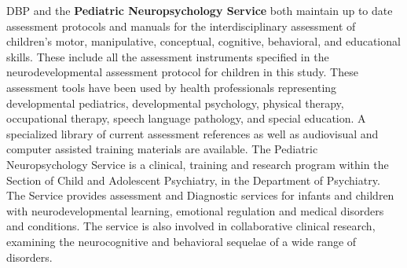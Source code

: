 DBP and the \textbf{Pediatric Neuropsychology Service} both maintain up to date assessment protocols and manuals for the interdisciplinary assessment of children’s motor, manipulative, conceptual, cognitive, behavioral, and educational skills. These include all the assessment instruments specified in the neurodevelopmental assessment protocol for children in this study. These assessment tools have been used by health professionals representing developmental pediatrics, developmental psychology, physical therapy, occupational therapy, speech language pathology, and special education. A specialized library of current assessment references as well as audiovisual and computer assisted training materials are available.  The Pediatric Neuropsychology Service is a clinical, training and research program within the Section of Child and Adolescent Psychiatry, in the Department of Psychiatry.  The Service provides assessment and Diagnostic services for infants and children with neurodevelopmental learning, emotional regulation and medical disorders and conditions.  The service is also involved in collaborative clinical research, examining the neurocognitive and behavioral sequelae of a wide range of disorders.  

